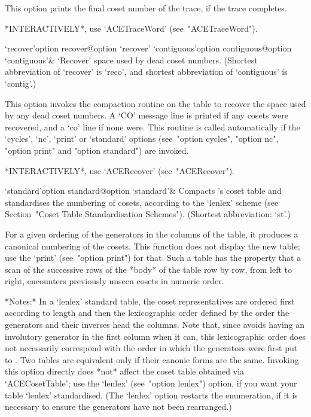 This option prints the final coset number of the trace, if  the  trace
completes.

*INTERACTIVELY*, use `ACETraceWord' (see~"ACETraceWord").

\enditems


\beginitems

\>`recover'{option recover}@{option `recover'}
\>`contiguous'{option contiguous}@{option `contiguous'}&
`Recover' space used by dead coset numbers.
(Shortest  abbreviation  of  `recover'   is   `reco',   and   shortest
abbreviation of `contiguous' is `contig'.)

This option invokes the compaction routine on the table to recover the
space used by any dead coset numbers. A `CO' message line  is  printed
if any cosets were recovered, and a  `co'  line  if  none  were.  This
routine is called automatically if  the  `cycles',  `nc',  `print'  or
`standard' options (see~"option cycles", "option nc",  "option  print"
and "option standard") are invoked.

*INTERACTIVELY*, use `ACERecover' (see~"ACERecover").

\>`standard'{option standard}@{option `standard'}&
Compacts {\ACE}'s  coset  table  and  standardises  the  numbering  of
cosets, according to the `lenlex'  scheme  (see  Section~"Coset  Table
Standardisation Schemes"). (Shortest abbreviation: `st'.)

For a given ordering of the generators in the columns of the table, it
produces a canonical numbering of the cosets. This function  does  not
display the new table; use the `print' (see~"option print") for  that.
Such a table has the property that a scan of the  successive  rows  of
the *body* of the table row by row, from  left  to  right,  encounters
previously unseen cosets in numeric order.

*Notes:*
In a `lenlex' standard table, the coset  representatives  are  ordered
first according to length and then the lexicographic order defined  by
the order the generators and their inverses  head  the  columns.  Note
that, since {\ACE} avoids having an involutory generator in the  first
column when it can, this  lexicographic  order  does  not  necessarily
correspond with the order in which the generators were  first  put  to
{\ACE}. Two tables are equivalent only if their canonic forms are  the
same. Invoking this option directly does *not* affect the {\GAP} coset
table obtained via  `ACECosetTable';  use  the  `lenlex'  (see~"option
lenlex") option, if you want your table  `lenlex'  standardised.  (The
`lenlex' option restarts the enumeration, if it is necessary to ensure
the generators have not been rearranged.)

